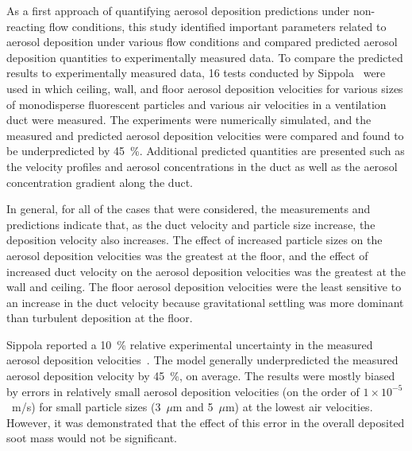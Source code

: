 As a first approach of quantifying aerosol deposition predictions under non-reacting flow conditions, this study identified important parameters related to aerosol deposition under various flow conditions and compared predicted aerosol deposition quantities to experimentally measured data. To compare the predicted results to experimentally measured data, 16 tests conducted by Sippola~\cite{Sippola:1} were used in which ceiling, wall, and floor aerosol deposition velocities for various sizes of monodisperse fluorescent particles and various air velocities in a ventilation duct were measured. The experiments were numerically simulated, and the measured and predicted aerosol deposition velocities were compared and found to be underpredicted by 45~\%. Additional predicted quantities are presented such as the velocity profiles and aerosol concentrations in the duct as well as the aerosol concentration gradient along the duct.

In general, for all of the cases that were considered, the measurements and predictions indicate that, as the duct velocity and particle size increase, the deposition velocity also increases. The effect of increased particle sizes on the aerosol deposition velocities was the greatest at the floor, and the effect of increased duct velocity on the aerosol deposition velocities was the greatest at the wall and ceiling. The floor aerosol deposition velocities were the least sensitive to an increase in the duct velocity because gravitational settling was more dominant than turbulent deposition at the floor.

Sippola reported a 10~\% relative experimental uncertainty in the measured aerosol deposition velocities~\cite{Sippola:2002}. The model generally underpredicted the measured aerosol deposition velocity by 45~\%, on average. The results were mostly biased by errors in relatively small aerosol deposition velocities (on the order of $1 \times 10^{-5}$~m/s) for small particle sizes (3~$\mu$m and 5~$\mu$m) at the lowest air velocities. However, it was demonstrated that the effect of this error in the overall deposited soot mass would not be significant.

